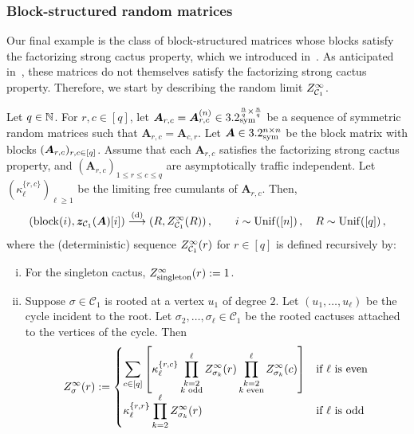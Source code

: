 \subsubsection{Block-structured random matrices}

\newcommand{\Community}{\textnormal{Community}}

Our final example is the class of block-structured matrices whose blocks satisfy the factorizing strong cactus property, which we introduced in~.
As anticipated in~, these matrices do not
themselves
satisfy the factorizing strong
cactus property.
Therefore, we start by describing the random
limit $Z^\infty_{{\cal C}_1}$.


\begin{lemma}\label{lem:block-matrix-cactus-limits}
    Let $q \in \mathbb{N}$. For $r,c\in [q]$, let ${\bm A}_{r,c} = {\bm A}_{r,c}^{(n)} \in 3.2^{\frac nq \times \frac nq}_{\mathrm{sym}}$ be a sequence of symmetric random matrices such that $\bm A_{r,c} = \bm A_{c,r}$.
    Let ${\bm A} \in 3.2^{n \times n}_{\mathrm{sym}}$ be the block matrix with blocks $({\bm A}_{r,c})_{r,c \in [q]}$.
    Assume that each $\bm A_{r,c}$ satisfies the factorizing strong cactus property,
    and $(\bm A_{r,c})_{1 \leq r\leq c \leq q}$
    are asymptotically traffic independent. Let $(\kappa^{\{r,c\}}_\ell)_{\ell\ge 1}$ be the limiting
    free cumulants of $\bm A_{r,c}$.
    Then,
    \[
        (\operatorname{block}(i), {\bm z}_{{\cal C}_1}(\bm A)[i]) \overset{\textnormal{(d)}}{\longrightarrow}  (R, Z_{{\cal C}_1}^\infty(R))\,, \qquad i \sim \mathrm{Unif}([n])\,, \quad R \sim \mathrm{Unif}([q])\,,
    \]
    where  the (deterministic) sequence $Z_{{\cal C}_1}^\infty(r)$ for $r\in [q]$ is defined recursively by:
    \begin{enumerate}[(i)]
        \item For the singleton cactus, $Z^\infty_{\mathrm{singleton}}(r) := 1$.
        
        \item Suppose $\sigma \in \mathcal C_1$ is rooted at a vertex $u_1$ of degree $2$. Let $(u_1, \ldots, u_{\ell})$ be
        the cycle incident to the root.
        Let
        $\sigma_2, \dots, \sigma_{\ell} \in \mathcal C_1$ be the rooted cactuses
        attached to the vertices of the cycle. Then
        \[
            Z^\infty_\sigma(r) :=
            \begin{cases}
                \displaystyle
                \sum_{c\in [q]} \left[\kappa_\ell^{\{r,c\}}
                \prod_{\substack{k=2\\k\textnormal{ odd}}}^{\ell} Z^\infty_{\sigma_k}(r) \prod_{\substack{k=2\\k\textnormal{ even}}}^{\ell} Z^\infty_{\sigma_k}(c)\right]
                & \text{if $\ell$ is even} \\
                \displaystyle
                \kappa_\ell^{\{r,r\}}
                \prod_{k=2}^{\ell} Z^\infty_{\sigma_k}(r)
                & \text{if $\ell$ is odd}
            \end{cases}
        \]
    

\end{enumerate}
\end{lemma}
